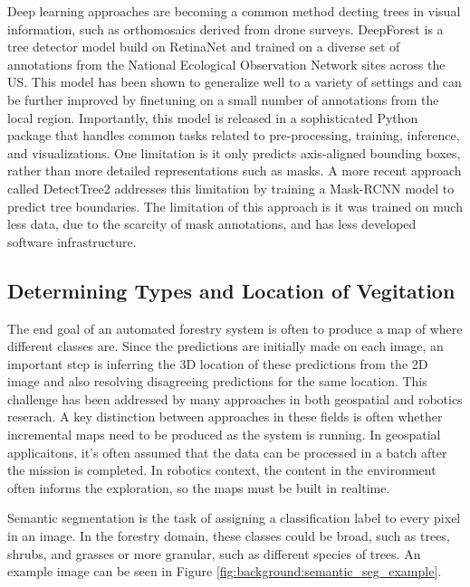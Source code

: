Deep learning approaches are becoming a common method decting trees in visual information, such as orthomosaics derived from drone surveys. DeepForest \cite{Weinstein2020DeepForest:Delineation} is a tree detector model build on RetinaNet \cite{Lin2020FocalDetection} and trained on
a diverse set of annotations from the National Ecological Observation Network sites
\cite{Keller2008ANetwork} across the US. This model has been shown to generalize well to a variety of settings and can be further improved by finetuning on a small number of annotations from the local region. Importantly, this model is released in a sophisticated Python package that handles common tasks related to pre-processing, training, inference, and visualizations. One limitation is it only predicts axis-aligned bounding boxes, rather than more detailed representations such as masks. A more recent approach called DetectTree2 \cite{DetectTree2} addresses this limitation by training a Mask-RCNN \cite{He2017MaskR-CNN} model to predict tree boundaries. The limitation of this approach is it was trained on much less data, due to the scarcity of mask annotations, and has less developed software infrastructure.


\subsection{Determining Types and Location of Vegitation}
The end goal of an automated forestry system is often to produce a map of where different classes are. Since the predictions are initially made on each image, an important step is inferring the 3D location of these predictions from the 2D image and also resolving disagreeing predictions for the same location. This challenge has been addressed by many approaches in both geospatial and robotics reserach. A key distinction between approaches in these fields is often whether incremental maps need to be produced as the system is running. In geospatial applicaitons, it's often assumed that the data can be processed in a batch after the mission is completed. In robotics context, the content in the environment often informs the exploration, so the maps must be built in realtime. 

Semantic segmentation is the task of assigning a classification label to every pixel in an image. In the forestry domain, these classes could be broad, such as trees, shrubs, and grasses or more granular, such as different species of trees. An example image can be seen in Figure \ref{fig:background:semantic_seg_example}.

